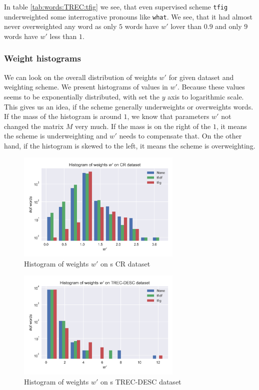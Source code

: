     In table \ref{tab:words:TREC:tfig} we see, that even supervised scheme \texttt{tfig} underweighted some interrogative pronouns like \texttt{what}.
    We see, that it had almost never overweighted any word as only $5$ words have $w'$ lover than $0.9$ and only $9$ words have $w'$ less than $1$.

    \newpage
    \subsubsection{Weight histograms}
    
    We can look on the overall distribution of weights $w'$ for given dataset and weighting scheme.
    We present histograms of values in $w'$.
    Because these values seems to be exponentially distributed, with set the $y$ axis to logarithmic scale.
    This gives us an idea, if the scheme generally underweights or overweights words.
    If the mass of the histogram is around $1$, we know that parameters $w'$ not changed the matrix $M$ very much.
    If the mass is on the right of the $1$, it means the scheme is underweighting and $w'$ needs to compensate that. On the other hand, if the histogram is skewed to the left, it means the scheme is overweighting.
    
    
    
    \begin{figure}
    \centerline{\includegraphics[width=0.7\textwidth]{images/histw_cr.png}}
    \caption[Histogram of weights $w'$ on s CR dataset]{Histogram of weights $w'$ on s CR dataset}
    \label{obr:hist:cr}
    \end{figure}

    \begin{figure}
    \centerline{\includegraphics[width=0.7\textwidth]{images/histw_desc.png}}
    \caption[Histogram of weights $w'$ on s TREC-DESC dataset]{Histogram of weights $w'$ on s TREC-DESC dataset}
    \label{obr:hist:desc}
    \end{figure}

